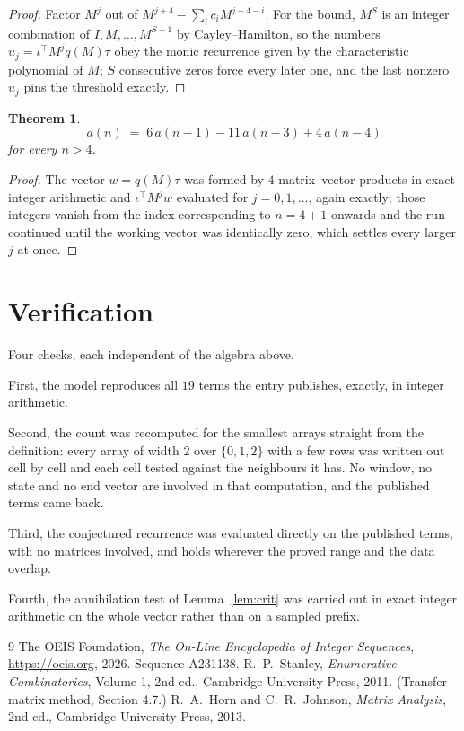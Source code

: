 \documentclass[11pt,a4paper]{article}
\theoremstyle{plain}
\newtheorem{theorem}{Theorem}
\theoremstyle{definition}
\begin{document}
\begin{proof}
Factor $M^{j}$ out of $M^{j+4}-\sum_ic_iM^{j+4-i}$. For the bound, $M^{S}$
is an integer combination of $I,M,\dots,M^{S-1}$ by Cayley--Hamilton, so the numbers
$u_j=\iota^{\!\top}M^{j}q(M)\tau$ obey the monic recurrence given by the characteristic
polynomial of $M$; $S$ consecutive zeros force every later one, and the last nonzero $u_j$
pins the threshold exactly.
\end{proof}

\begin{theorem}
\[
a(n)\;=\;6\,a(n-1) - 11\,a(n-3) + 4\,a(n-4)
\]
for every $n>4$.
\end{theorem}

\begin{proof}
The vector $w=q(M)\tau$ was formed by $4$ matrix--vector products in exact integer
arithmetic and $\iota^{\!\top}M^{j}w$ evaluated for $j=0,1,\dots$, again exactly; those
integers vanish from the index corresponding to $n=4+1$ onwards and the run continued
until the working vector was identically zero, which settles every larger $j$ at once.
\end{proof}

\section{Verification}

Four checks, each independent of the algebra above.

First, the model reproduces all $19$ terms the entry publishes, exactly, in integer
arithmetic.

Second, the count was recomputed for the smallest arrays straight from the definition: every
array of width $2$ over $\{0,1,2\}$ with a few rows was written out cell by cell and each cell
tested against the neighbours it has. No window, no state and no end vector are involved in that
computation, and the published terms came back.

Third, the conjectured recurrence was evaluated directly on the published terms, with no
matrices involved, and holds wherever the proved range and the data overlap.

Fourth, the annihilation test of Lemma~\ref{lem:crit} was carried out in exact integer
arithmetic on the whole vector rather than on a sampled prefix.

\begin{thebibliography}{9}
 The OEIS Foundation, \emph{The On-Line Encyclopedia of Integer
Sequences}, \url{https://oeis.org}, 2026. Sequence A231138.
 R.~P.~Stanley, \emph{Enumerative Combinatorics}, Volume 1, 2nd ed.,
Cambridge University Press, 2011. (Transfer-matrix method, Section 4.7.)
 R.~A.~Horn and C.~R.~Johnson, \emph{Matrix Analysis}, 2nd ed., Cambridge
University Press, 2013.
\end{thebibliography}
\end{document}
